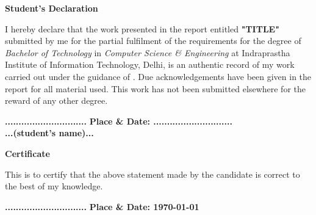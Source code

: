 \documentclass[letterpage, 11pt]{report}
\def\title{TITLE}
\begin{document}


%

\newpage

\begin{center}
\textbf{\Large Student's Declaration}\label{section:declaration}
\end{center}
I hereby declare that the work presented in the report entitled \textbf{"\title"} submitted by me for the partial fulfilment of the requirements for the degree of \emph{Bachelor of Technology} in \emph{Computer Science \& Engineering} at
 Indraprastha Institute of Information Technology, Delhi, is an authentic record of my work carried out under the guidance of \textbf{\supervisorone}. Due acknowledgements have been given in the report for all material used. This work has not been submitted elsewhere for the reward of any other degree.
 \\ \vspace{0.5in}

\textbf{..............................}\hfill
\textbf{ Place \& Date: .............................} \\
\textbf{...(student's name)...}




\vspace{3in}
\begin{center}
\textbf{\Large Certificate} \label{section:certificate}
\end{center}
This is to certify that the above statement made by the candidate is correct to the best of my knowledge.
 \\ \vspace{0.4in}

\textbf{..............................}\hfill
\textbf{ Place \& Date: \today} \\
\textbf{\supervisorone}\\



\pagebreak

\begin{abstract}

\lipsum[1]

\vspace{2in}
Keywords: (e.g.Mobile computing, security, complexity, algorithms, image analysis, machine learning, information retrieval)
\end{abstract}
\end{document}
